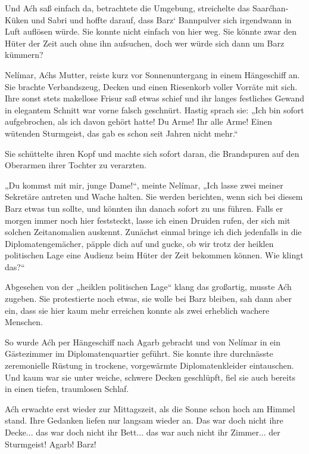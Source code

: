 Und Aćh saß einfach da, betrachtete die Umgebung, streichelte das Saarćhan-Küken und Sabri und hoffte darauf, dass Barz‘ Bannpulver sich irgendwann in Luft auflösen würde. Sie konnte nicht einfach von hier weg. Sie könnte zwar den Hüter der Zeit auch ohne ihn aufsuchen, doch wer würde sich dann um Barz kümmern?



\trennzeichen



Nelímar, Aćhs Mutter, reiste kurz vor Sonnenuntergang in einem Hängeschiff an. Sie brachte Verbandszeug, Decken und einen Riesenkorb voller Vorräte mit sich. Ihre sonst stets makellose Frisur saß etwas schief und ihr langes festliches Gewand in elegantem Schnitt war vorne falsch geschnürt. Hastig sprach sie: „Ich bin sofort aufgebrochen, als ich davon gehört hatte! Du Arme! Ihr alle Arme! Einen wütenden Sturmgeist, das gab es schon seit Jahren nicht mehr.“

Sie schüttelte ihren Kopf und machte sich sofort daran, die Brandspuren auf den Oberarmen ihrer Tochter zu verarzten.

„Du kommst mit mir, junge Dame!“, meinte Nelímar, „Ich lasse zwei meiner Sekretäre antreten und Wache halten. Sie werden berichten, wenn sich bei diesem Barz etwas tun sollte, und könnten ihn danach sofort zu uns führen. Falls er morgen immer noch hier feststeckt, lasse ich einen Druiden rufen, der sich mit solchen Zeitanomalien auskennt. Zunächst einmal bringe ich dich jedenfalls in die Diplomatengemächer, päpple dich auf und gucke, ob wir trotz der heiklen politischen Lage eine Audienz beim Hüter der Zeit bekommen können. Wie klingt das?“

Abgesehen von der „heiklen politischen Lage“ klang das großartig, musste Aćh zugeben. Sie protestierte noch etwas, sie wolle bei Barz bleiben, sah dann aber ein, dass sie hier kaum mehr erreichen konnte als zwei erheblich wachere Menschen.

So wurde Aćh per Hängeschiff nach Agarb gebracht und von Nelímar in ein Gästezimmer im Diplomatenquartier geführt. Sie konnte ihre durchnässte zeremonielle Rüstung in trockene, vorgewärmte Diplomatenkleider eintauschen. Und kaum war sie unter weiche, schwere Decken geschlüpft, fiel sie auch bereits in einen tiefen, traumlosen Schlaf.



\trennzeichen



Aćh erwachte erst wieder zur Mittagszeit, als die Sonne schon hoch am Himmel stand. Ihre Gedanken liefen nur langsam wieder an. Das war doch nicht ihre Decke... das war doch nicht ihr Bett... das war auch nicht ihr Zimmer... der Sturmgeist! Agarb! Barz!


